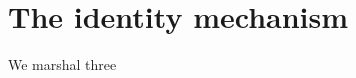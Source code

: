 \documentclass[11pt]{article}
\begin{document}
\section{The identity mechanism}\label{s:mech}

We marshal three




%
%
%
%
\end{document}
